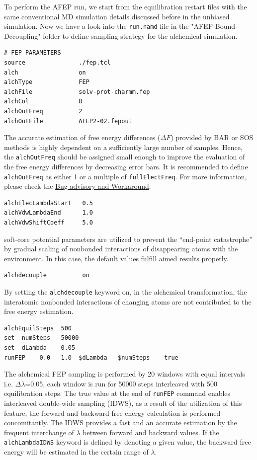 \documentclass[9pt,tutorial]{livecoms}
\begin{document}
To perform the AFEP run, we start from the equilibration restart files with the same conventional MD simulation details discussed before in the unbiased simulation. Now we have a look into the \texttt{run.namd} file in the "AFEP-Bound-Decoupling" folder to define sampling strategy for the alchemical simulation.
\begin{verbatim}
# FEP PARAMETERS
source               ./fep.tcl
alch                 on
alchType             FEP
alchFile             solv-prot-charmm.fep
alchCol              B
alchOutFreq          2
alchOutFile          AFEP2-02.fepout
\end{verbatim}
The accurate estimation of free energy differences ($\Delta F$) provided by BAR or SOS methods is highly dependent on a sufficiently large number of samples. Hence, the \texttt{alchOutFreq} should be assigned small enough to improve the evaluation of the free energy differences by decreasing error bars. It is recommended to define \texttt{alchOutFreq} as either 1 or a multiple of \texttt{fullElectFreq}. For more information, please check the \href{https://www.ks.uiuc.edu/Research/namd/mailing_list/namd-l.2020-2021/1487.html}{Bug advisory and Workaround}.
\begin{verbatim}
alchElecLambdaStart   0.5
alchVdwLambdaEnd      1.0
alchVdwShiftCoeff     5.0
\end{verbatim}
soft-core potential parameters are utilized to prevent the “end-point catastrophe” by gradual scaling of nonbonded interactions of disappearing atoms with the environment. In this case, the default values fulfill aimed results properly.
\begin{verbatim}
alchdecouple          on
\end{verbatim}
By setting the \texttt{alchdecouple} keyword on, in the alchemical transformation, the interatomic nonbonded interactions of changing atoms are not contributed to the free energy estimation.
\begin{verbatim}
alchEquilSteps  500
set  numSteps   50000
set  dLambda    0.05
runFEP    0.0   1.0  $dLambda   $numSteps    true
\end{verbatim}
The alchemical FEP sampling is performed by 20 windows with equal intervals i.e. {$\Delta\lambda$=0.05}, each window is run for 50000 steps interleaved with 500 equilibration steps.
The true value at the end of \texttt{runFEP} command enables interleaved double-wide sampling (IDWS), as a result of the utilization of this feature, the forward and backward free energy calculation is performed concomitantly. The IDWS provides a fast and an accurate estimation by the frequent interchange of {$\lambda$} between forward and backward values. If the \texttt{alchLambdaIDWS} keyword is defined by denoting a given value, the backward free energy will be estimated in the certain range of {$\lambda$}.
\end{document}

